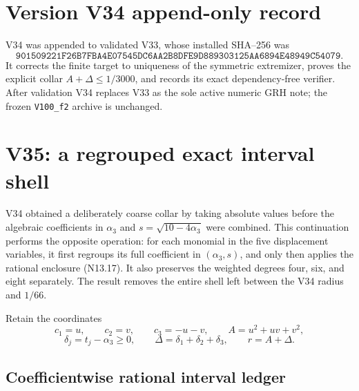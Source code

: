 \documentclass[11pt]{article}
\theoremstyle{definition}
\theoremstyle{remark}
\begin{document}
\section*{Version V34 append-only record}

V34 was appended to validated V33, whose installed SHA--256 was
\[
 \texttt{901509221F26B7FBA4E07545DC6AA2B8DFE9D889303125AA6894E48949C54079}.
 \tag{N34.19}
\]
It corrects the finite target to uniqueness of the symmetric extremizer,
proves the explicit collar \(A+\Delta\leq1/3000\), and records its exact
dependency-free verifier.  After validation V34 replaces V33 as the sole
active numeric GRH note; the frozen \texttt{V100\_f2} archive is unchanged.



\section{V35: a regrouped exact interval shell}
\label{sec:f2v35-regrouped-shell}

V34 obtained a deliberately coarse collar by taking absolute values before
the algebraic coefficients in \(\alpha_3\) and
\(s=\sqrt{10-4\alpha_3}\) were combined.  This continuation performs the
opposite operation: for each monomial in the five displacement variables,
it first regroups its full coefficient in \((\alpha_3,s)\), and only then
applies the rational enclosure \textup{(N13.17)}.  It also preserves the
weighted degrees four, six, and eight separately.  The result removes the
entire shell left between the V34 radius and \(1/66\).

Retain the coordinates
\[
 c_1=u,\qquad c_2=v,\qquad c_3=-u-v,\qquad
 A=u^2+uv+v^2,
\tag{N35.1}
\]
\[
 \delta_j=t_j-\alpha_3\geq0,\qquad
 \Delta=\delta_1+\delta_2+\delta_3,\qquad r=A+\Delta.
\tag{N35.2}
\]

\subsection{Coefficientwise rational interval ledger}
\end{document}
